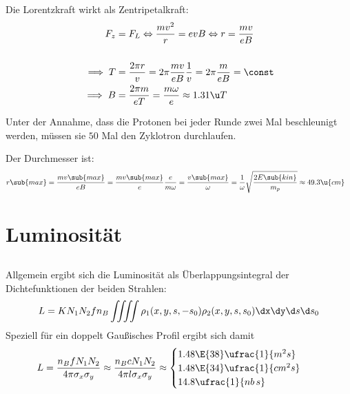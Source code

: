 \documentclass[exb]{exercise_5.0}
\begin{document}
\subsection{}
Die Lorentzkraft wirkt als Zentripetalkraft:
\begin{align*}
    F_z &= F_L \Leftrightarrow\frac{m v^2}r = e v B \Leftrightarrow r = \frac{mv}{e B} \\
    \\
    \implies T &= \frac{2\pi r}{v} = 2\pi \frac{mv}{e B} \frac 1v = 2\pi \frac{m}{e B} =\const\\
    \implies B &= \frac{2\pi m }{e T } = \frac{m\omega}{e} \approx 1.31 \u T 
\end{align*}

Unter der Annahme, dass die Protonen bei jeder Runde zwei Mal beschleunigt werden, 
müssen sie $50$ Mal den Zyklotron durchlaufen.

Der Durchmesser ist:
\begin{align*}
    r\sub{max} &= \frac{mv\sub{max}}{e B} 
    = \frac{mv\sub{max}}{e} \frac e{m\omega} 
    = \frac{ v\sub{max}} \omega  
    = \frac1\omega \sqrt{\frac{2E\sub{kin}}{m_p}}
    \approx 49.3 \u{cm}
\end{align*}

\section{Luminosität}

\subsection{}
Allgemein ergibt sich die Luminosität als Überlappungsintegral der Dichtefunktionen der beiden Strahlen:
\begin{align*}
    L = K N_1 N_2 f n_B \iiiint  \rho_1(x,y,s,-s_0)\rho_2(x,y,s,s_0) \dx \dy \d s \d s_0
\end{align*}
Speziell für ein doppelt Gaußisches Profil ergibt sich damit 
\begin{align*}
    L &= \frac{n_B f N_1 N_2}{4\pi \sigma_x \sigma_y} 
    \approx \frac{n_B c N_1 N_2}{4\pi l \sigma_x \sigma_y}
    \approx\begin{cases}
         1.48\E{38}\ufrac{1}{m^2s}\\
         1.48\E{34} \ufrac{1}{cm^2s}\\
         14.8\ufrac{1}{nb\, s} 
    \end{cases}
\end{align*}
\end{document}

